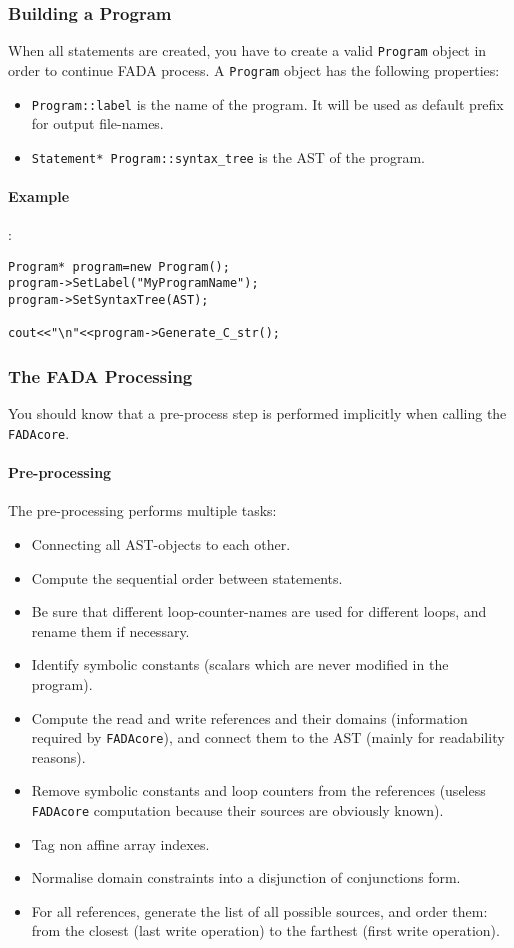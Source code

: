 \subsubsection{Building a Program}

When all statements are created, you have to create a valid \verb|Program| object in order to continue FADA process. A \verb|Program| object has the following properties:
\begin{itemize}
 \item \verb|Program::label| is the name of the program. It will be used as default prefix for output file-names.
 \item \verb|Statement* Program::syntax_tree| is the AST of the program.
\end{itemize}

\paragraph{Example} :

\begin{lstlisting}[frame=single,framerule=0pt]
Program* program=new Program();
program->SetLabel("MyProgramName");
program->SetSyntaxTree(AST);

cout<<"\n"<<program->Generate_C_str();
\end{lstlisting}

\subsubsection{The FADA Processing}
You should know that a pre-process step is performed implicitly when calling the \verb|FADAcore|.
\paragraph{Pre-processing}
The pre-processing performs multiple tasks:
\begin{itemize}
 \item Connecting all AST-objects to each other.
 \item Compute the sequential order between statements.
 \item Be sure that different loop-counter-names are used for different loops, and rename them if necessary.
 \item Identify symbolic constants (scalars which are never modified in the program).
 \item Compute the read and write references and their domains (information required by \verb|FADAcore|), and connect them to the AST (mainly for readability reasons).
 \item Remove symbolic constants and loop counters from the references (useless \verb|FADAcore| computation because their sources are obviously known).
 \item Tag non affine array indexes.
 \item Normalise domain constraints into a disjunction of conjunctions form.
 \item For all references, generate the list of all possible sources, and order them: from the closest (last write operation) to the farthest (first write operation).

\end{itemize}

